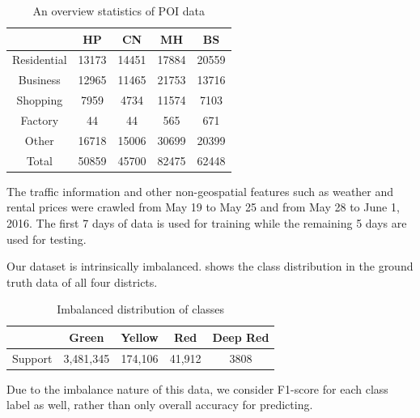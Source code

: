\begin{table}[th]
	\small
	\centering
	\caption{An overview statistics of POI data}
	\label{tbl:poistats}
	\begin{tabular}{|c|c|c|c|c|}
		\hline
		& HP & CN & MH & BS \\ \hline \hline
		Residential & 13173   & 14451     & 17884   & 20559   \\ \hline
		Business    & 12965   & 11465     & 21753   & 13716   \\ \hline
		Shopping    & 7959    & 4734      & 11574   & 7103    \\ \hline
		Factory     & 44      & 44        & 565     & 671     \\ \hline
		Other       & 16718   & 15006     & 30699   & 20399   \\ \hline
		Total       & 50859   & 45700     & 82475   & 62448   \\ \hline
	\end{tabular}
\end{table}

The traffic information and other non-geospatial features such as weather and rental prices were crawled from May 19 to May 25 and from May 28 to June 1, 2016. The first 7 days of data is used for training while
the remaining 5 days are used for testing.

Our dataset is intrinsically imbalanced.  shows the 
class distribution in the ground truth data of all four districts.

\begin{table}[th]
\small
\centering
\caption{Imbalanced distribution of classes}
\label{tab:imbal}
\begin{tabular}{|c|c|c|c|c|} \hline
 & Green & Yellow & Red & Deep Red \\ \hline
Support & 3,481,345 & 174,106 & 41,912 & 3808 \\ \hline
\end{tabular}
\end{table}

Due to the imbalance nature of this data, we consider F1-score for each class label as well, rather than
only overall accuracy for predicting.
 
